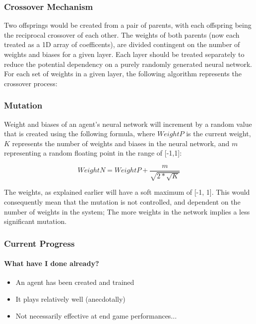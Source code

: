 \documentclass{beamer}
\begin{document}
	\begin{frame}
		\frametitle{Crossover Mechanism}


		Two offsprings would be created from a pair of parents, with each offspring being the reciprocal crossover of each other. The weights of both parents (now each treated as a 1D array of coefficents), are divided contingent on the number of weights and biases for a given layer. Each layer should be treated separately to reduce the potential dependency on a purely randomly generated neural network. For each set of weights in a given layer, the following algorithm represents the crossover process:

				
	\end{frame}

	\begin{frame}
		\frametitle{Mutation}
		Weight and biases of an agent's neural network will increment by a random value that is created using the following formula, where $WeightP$ is the current weight, $K$ represents the number of weights and biases in the neural network, and $m$ representing a random floating point in the range of [-1,1]:

			$$ WeightN = WeightP + \frac{m}{\sqrt{2 * \sqrt{K} }}$$

			The weights, as explained earlier will have a soft maximum of [-1, 1]. This  would consequently mean that the mutation is not controlled, and dependent on the number of weights in the system; The more weights in the network implies a less significant mutation.
	\end{frame}


\begin{frame}
	\frametitle{Current Progress}
	\framesubtitle{What have I done already?}

	\begin{itemize}
		\item An agent has been created and trained
		\item It plays relatively well (anecdotally)
		\item Not necessarily effective at end game performances...
	\end{itemize}

\end{frame}
\end{document}
